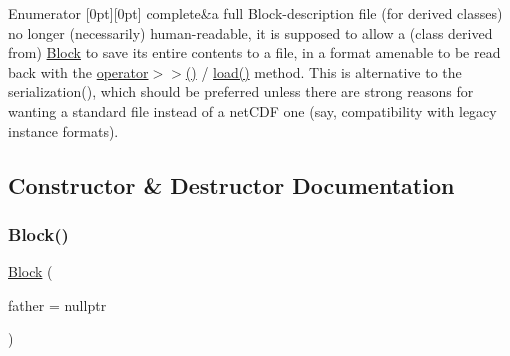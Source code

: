 \begin{DoxyEnumFields}{Enumerator}
[0pt][0pt]{}\mbox{\label{class_s_m_spp__di__unipi__it_1_1_block_aae1eff6b4e72eef08cf2d8334500f9b6aef0b13bcf8ce1950bdda75bc1abaa8df}} 
complete&a full Block-\/description file (for derived classes) no longer (necessarily) human-\/readable, it is supposed to allow a (class derived from) \mbox{\hyperlink{class_s_m_spp__di__unipi__it_1_1_block}{Block}} to save its entire contents to a file, in a format amenable to be read back with the \mbox{\hyperlink{class_s_m_spp__di__unipi__it_1_1_block_a7124899e39ee61687c43c1061d3a0353}{operator$>$$>$()}} / \mbox{\hyperlink{class_s_m_spp__di__unipi__it_1_1_block_a27ae9e4279482d52342c7958c34a43c6}{load()}} method. This is alternative to the serialization(), which should be preferred unless there are strong reasons for wanting a standard file instead of a net\+C\+DF one (say, compatibility with legacy instance formats). \\
\hline

\end{DoxyEnumFields}


\subsection{Constructor \& Destructor Documentation}
\mbox{\label{class_s_m_spp__di__unipi__it_1_1_block_adcd18ebef72af31e0d4baae7dc47eeda}} 
\subsubsection{\texorpdfstring{Block()}{Block()}\hspace{0.1cm}{\footnotesize\ttfamily [1/2]}}
{\footnotesize\ttfamily \mbox{\hyperlink{class_s_m_spp__di__unipi__it_1_1_block}{Block}} (\begin{DoxyParamCaption}\item[{\mbox{\hyperlink{class_s_m_spp__di__unipi__it_1_1_block}{Block}} $\ast$}]{father = {\ttfamily nullptr} }\end{DoxyParamCaption})\hspace{0.3cm}{\ttfamily [inline]}}



